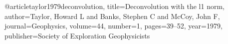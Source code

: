 @article{taylor1979deconvolution,
  title={Deconvolution with the l1 norm},
  author={Taylor, Howard L and Banks, Stephen C and McCoy, John F},
  journal={Geophysics},
  volume={44},
  number={1},
  pages={39--52},
  year={1979},
  publisher={Society of Exploration Geophysicists}
}